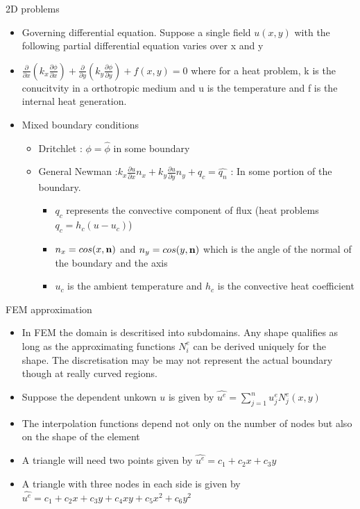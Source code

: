	\begin{frame}{2D problems}
		\begin{itemize}
			\item Governing differential equation. Suppose a single field $u(x,y)$ with the following partial differential equation  varies over x and y
			\item $\frac{\partial }{\partial x} \left(k_x\frac{\partial \phi}{\partial x} \right) + \frac{\partial }{\partial y} \left(k_y\frac{\partial \phi}{\partial y} \right) + f(x,y) = 0$
			where for a heat problem, k is the conucitvity in a orthotropic medium and u is the temperature and f is the internal heat generation.  
			\item Mixed boundary conditions 
			\begin{itemize}
				\item Dritchlet : $\phi = \hat{\phi}$ in some boundary
				\item General Newman :$k_x\frac{\partial u}{\partial x} n_x  + k_y\frac{\partial u}{\partial y} n_y + q_c =  \hat{q_n}$ : In some portion of the boundary. 
				\begin{itemize}
					\item $q_c$ represents the convective component of flux (heat problems $q_c = h_c(u-u_c)$)
					\item $n_x = cos(x,\mathbf{n})$ and $n_y = cos(y,\mathbf{n})$ which is the angle of the normal of the boundary and the axis
					\item $u_c$ is the ambient temperature and $h_c$ is the convective heat coefficient				
				\end{itemize}		
			\end{itemize}
		\end{itemize}
	\end{frame}


	\begin{frame}{FEM approximation}
		\begin{itemize}
			\item In FEM the domain is descritised into subdomains. Any shape qualifies as long as the approximating functions $N_i^e$ can be derived uniquely for the shape. The discretisation may be may not represent the actual boundary though at really curved regions.
			\item Suppose the dependent unkown $u$ is given by $\hat{u^e} = \sum_{j=1}^{n} u_j^eN_j^e(x,y)$
			\item The interpolation functions depend not only on the number of nodes but also on the shape of the element
			\item A triangle will need two points given by $\hat{u^e} = c_1+c_2x+c_3y$
			\item A triangle with three nodes in each side is given by $\hat{u^e} = c_1+c_2x+c_3y + c_4xy + c_5x^2 + c_6y^2$			
		\end{itemize}
	\end{frame}



